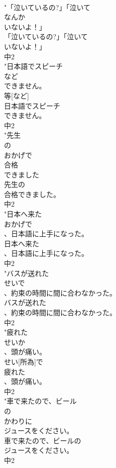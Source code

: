 \documentclass[8pt]{extreport}
\begin{document}
\begin{CJK}{UTF8}{min}
\\	"「泣いているの?」「泣いて
\\	なんか
\\	いないよ！」
\\	「泣いているの?」「泣いて
\\	いないよ！」
\\	中2
\\	"日本語でスピーチ
\\	など
\\	できません。　
\\	等[など]
\\	日本語でスピーチ
\\	できません。
\\	中2
\\	"先生
\\	の
\\	おかげで
\\	合格
\\	できました
\\	先生の
\\	合格できました。
\\	中2
\\	"日本へ来た
\\	おかげで
\\	、日本語に上手になった。
\\	日本へ来た
\\	、日本語に上手になった。
\\	中2
\\	"バスが送れた
\\	せいで
\\	、約束の時間に間に合わなかった。
\\	バスが送れた
\\	、約束の時間に間に合わなかった。
\\	中2
\\	"疲れた
\\	せいか
\\	、頭が痛い。　
\\	せい[所為]で
\\	疲れた
\\	、頭が痛い。
\\	中2
\\	"車で来たので、ビール
\\	の
\\	かわりに
\\	ジュースをください。
\\	車で来たので、ビールの
\\	ジュースをください。
\\	中2

\end{CJK}
\end{document}
